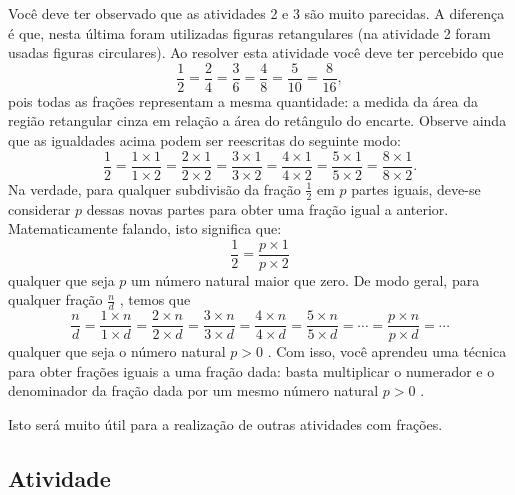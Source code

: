 \documentclass[a4,12pt]{book}
\begin{document}
\begin{refletindo*}[breakable]{}{}  
  Você deve ter observado que as atividades 2 e 3 são muito parecidas.   
  A diferença é que, nesta última foram utilizadas figuras retangulares (na atividade 2 foram usadas figuras circulares).   
  Ao resolver esta atividade você deve ter percebido que   
  $$\dfrac{1}{2}=\dfrac{2}{4}=\dfrac{3}{6}=\dfrac{4}{8}=\dfrac{5}{10}=\dfrac{8}{16},$$  
  pois todas as frações representam a mesma quantidade: a medida da área da região retangular cinza em relação a área do retângulo do encarte.  
  Observe ainda que as igualdades acima podem ser reescritas do seguinte modo:  
  $$\dfrac{1}{2}=\dfrac{1 \times 1}{1 \times 2}= \dfrac{2 \times 1}{2 \times 2} =\dfrac{3 \times 1}{3 \times 2} = \dfrac{4 \times 1}{4 \times 2} = \dfrac{5 \times 1}{5 \times 2}= \dfrac{8 \times 1}{8 \times 2}.$$  
  Na verdade, para qualquer subdivisão da fração   $\frac{1}{2}$    em   $p$   partes iguais, deve-se considerar   $p$   dessas novas partes para obter uma fração igual a anterior. Matematicamente falando, isto significa que:  
  $$\dfrac{1}{2}= \dfrac{p \times 1}{p \times 2}$$     
  qualquer que seja   $p$   um número natural maior que zero.  
  De modo geral, para qualquer fração    $\frac{n}{d}$  ,  temos que  
  $$\dfrac{n}{d}=\dfrac{1 \times n}{1 \times d}= \dfrac{2 \times n}{2 \times d} = \dfrac{3 \times n}{3 \times d} = \dfrac{4 \times n}{4 \times d} = \dfrac{5 \times n}{5 \times d}=\cdots =  \dfrac{p \times n}{p \times d}= \cdots$$  
  qualquer que seja o número natural   $p > 0$  .  
  Com isso, você aprendeu uma técnica para obter frações iguais a uma fração dada: basta multiplicar o numerador e o denominador da fração dada por um mesmo número natural   $p > 0$  .   
  
  Isto será muito útil para a realização de outras atividades com frações.  
\end{refletindo*}



\subsection{Atividade}
\end{document}
